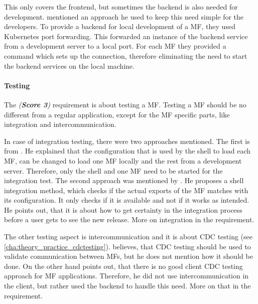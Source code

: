 This only covers the frontend, but sometimes the backend is also needed for development.
\textciteRehm{} mentioned an approach he used to keep this need simple for the developers.
To provide a backend for local development of a \ac{MF}, they used Kubernetes port forwarding\footnotemark.
This forwarded an instance of the backend service from a development server to a local port.
For each \ac{MF} they provided a command which sets up the connection, therefore eliminating the need to start the backend services on the local machine.





\paragraph{Testing}\label{cha:requirement_detail_developer_testing}

The \textit{ (\textbf{Score 3})} requirement is about testing a \ac{MF}.
Testing a \ac{MF} should be no different from a regular application, except for the \ac{MF} specific parts, like integration and intercommunication.

In case of integration testing, there were two approaches mentioned.
The first is from \textcite{Dornenburg.2019}.
He explained that the configuration that is used by the shell to load each \ac{MF}, can be changed to load one \ac{MF} locally and the rest from a development server.
Therefore, only the shell and one \ac{MF} need to be started for the integration test.
The second approach was mentioned by \textcite{Laug.2018b}.
He proposes a shell integration method, which checks if the actual exports of the \ac{MF} matches with its configuration.
It only checks if it is available and not if it works as intended.
He points out, that it is about how to get certainty in the integration process before a user gets to see the new release.
More on integration in the \textit{} requirement.


The other testing aspect is intercommunication and it is about \ac{CDC} testing (see \ref{cha:theory_practice_cdctesting}).
\textcite{Jackson.2019} believes, that \ac{CDC} testing should be used to validate communication between \acp{MF}, but he does not mention how it should be done.
On the other hand \textcite{Laug.2018} points out, that there is no good client \ac{CDC} testing approach for \ac{MF} applications.
Therefore, he did not use intercommunication in the client, but rather used the backend to handle this need.
More on that in the \textit{} requirement.
